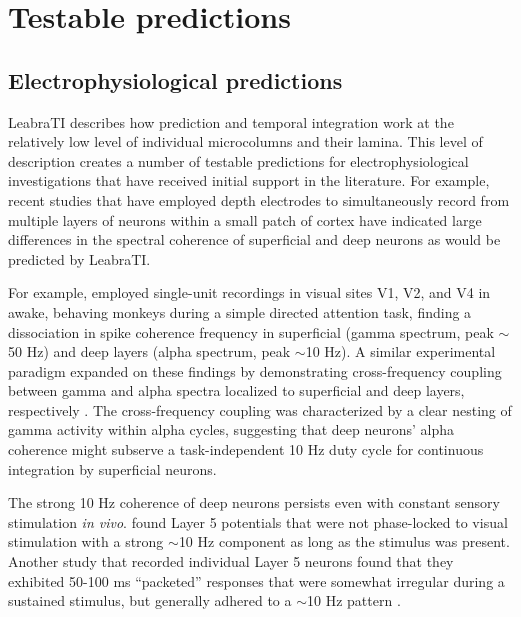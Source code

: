 \documentclass[dwyatte_dissertation.tex]{subfiles}
\begin{document}
\section{Testable predictions}
\subsection{Electrophysiological predictions}
LeabraTI describes how prediction and temporal integration work at the relatively low level of individual microcolumns and their lamina. This level of description creates a number of testable predictions for electrophysiological investigations that have received initial support in the literature. For example, recent studies that have employed depth electrodes to simultaneously record from multiple layers of neurons within a small patch of cortex have indicated large differences in the spectral coherence of superficial and deep neurons \cite{MaierAdamsAuraEtAl10} as would be predicted by LeabraTI.

For example,  employed single-unit recordings in visual sites V1, V2, and V4 in awake, behaving monkeys during a simple directed attention task, finding a dissociation in spike coherence frequency in superficial (gamma spectrum, peak $\sim$50 Hz) and deep layers (alpha spectrum, peak $\sim$10 Hz). A similar experimental paradigm expanded on these findings by demonstrating cross-frequency coupling between gamma and alpha spectra localized to superficial and deep layers, respectively \cite{SpaakBonnefondMaierEtAl12}. The cross-frequency coupling was characterized by a clear nesting of gamma activity within alpha cycles, suggesting that deep neurons' alpha coherence might subserve a task-independent 10 Hz duty cycle \cite{JensenMazaheri10,JensenBonnefondVanRullen12,JensenGipsBergmannEtAl14} for continuous integration by superficial neurons.

The strong 10 Hz coherence of deep neurons persists even with constant sensory stimulation \textit{in vivo}.  found Layer 5 potentials that were not phase-locked to visual stimulation with a strong $\sim$10 Hz component as long as the stimulus was present. Another study that recorded individual Layer 5 neurons found that they exhibited 50-100 ms ``packeted'' responses that were somewhat irregular during a sustained stimulus, but generally adhered to a $\sim$10 Hz pattern \cite{LuczakBarthoHarris13}. 
\end{document}
